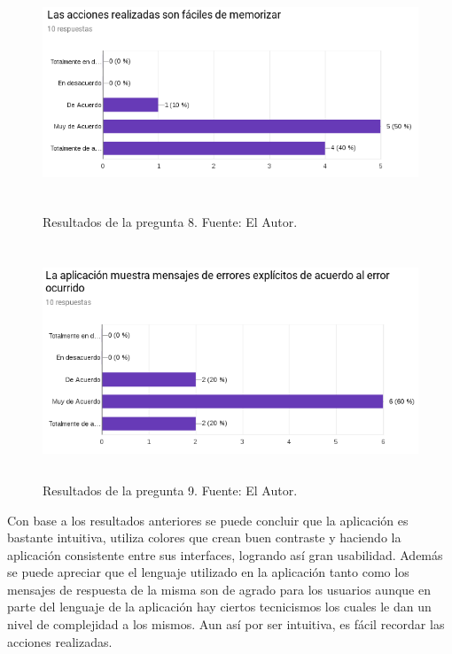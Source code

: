 \begin{figure}[H]
\begin{center}
	\includegraphics[width=\textwidth,height=7cm]{img/encuestas/acciones_memorizables.png}
\end{center}
\caption{Resultados de la pregunta 8. Fuente: El Autor.}
\label{fig:respuesta_acciones_memorizables}
\end{figure}
\newpage
\begin{figure}[H]
\begin{center}
	\includegraphics[width=\textwidth,height=7cm]{img/encuestas/mensajes_errores_explicitos.png}
\end{center}
\caption{Resultados de la pregunta 9. Fuente: El Autor.}
\label{fig:respuesta_mensajes_errores_explicitos}
\end{figure}

Con base a los resultados anteriores se puede concluir que la aplicación es bastante intuitiva, utiliza colores que crean buen contraste y haciendo la aplicación consistente entre sus interfaces, logrando así gran usabilidad. Además se puede apreciar que el lenguaje utilizado en la aplicación tanto como los mensajes de respuesta de la misma son de agrado para los usuarios aunque en parte del lenguaje de la aplicación hay ciertos tecnicismos los cuales le dan un nivel de complejidad a los mismos. Aun así por ser intuitiva, es fácil recordar las acciones realizadas.


\setlength{\parskip}{0mm}

